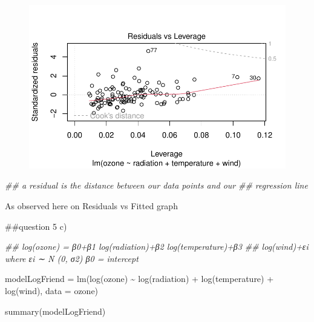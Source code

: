 \documentclass[
  a4paper,
  DIV=11,
  numbers=noendperiod]{scrartcl}
\newenvironment{Shaded}{\begin{snugshade}}{\end{snugshade}}
\newcommand{\AttributeTok}[1]{\textcolor[rgb]{0.40,0.45,0.13}{#1}}
\newcommand{\DocumentationTok}[1]{\textcolor[rgb]{0.37,0.37,0.37}{\textit{#1}}}
\newcommand{\FunctionTok}[1]{\textcolor[rgb]{0.28,0.35,0.67}{#1}}
\newcommand{\NormalTok}[1]{\textcolor[rgb]{0.00,0.23,0.31}{#1}}
\newcommand{\OtherTok}[1]{\textcolor[rgb]{0.00,0.23,0.31}{#1}}
\newcommand{\SpecialCharTok}[1]{\textcolor[rgb]{0.37,0.37,0.37}{#1}}
\begin{document}
\begin{figure}[H]

{\centering \includegraphics{StatsAssignment_files/figure-pdf/unnamed-chunk-8-4.pdf}

}

\end{figure}

\begin{Shaded}
\begin{Highlighting}[]
\DocumentationTok{\#\# a residual is the distance between our data points and our}
\DocumentationTok{\#\# regression line}
\end{Highlighting}
\end{Shaded}

As observed here on Residuals vs Fitted graph

\#\#question 5 c)

\begin{Shaded}
\begin{Highlighting}[]
\DocumentationTok{\#\# log(ozone) = β0+β1 log(radiation)+β2 log(temperature)+β3}
\DocumentationTok{\#\# log(wind)+εi where εi ∼ N (0, σ2) β0 = intercept}

\NormalTok{modelLogFriend }\OtherTok{=} \FunctionTok{lm}\NormalTok{(}\FunctionTok{log}\NormalTok{(ozone) }\SpecialCharTok{\textasciitilde{}} \FunctionTok{log}\NormalTok{(radiation) }\SpecialCharTok{+} \FunctionTok{log}\NormalTok{(temperature) }\SpecialCharTok{+} \FunctionTok{log}\NormalTok{(wind),}
    \AttributeTok{data =}\NormalTok{ ozone)}


\FunctionTok{summary}\NormalTok{(modelLogFriend)}
\end{Highlighting}
\end{Shaded}
\end{document}
